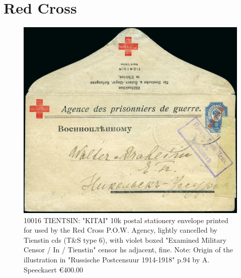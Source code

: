\section{Red Cross}

\begin{figure}[htbp]
\centering
\includegraphics[width=.95\textwidth]{../russian-post-offices-in-china/10016.jpg}
\caption{
10016	TIENTSIN: "KITAI" 10k postal stationery envelope printed for used by
the Red Cross P.O.W. Agency, lightly cancelled by Tienstin cds (T\&S type 6), 
with violet boxed "Examined Military Censor / In / Tienstin" censor hs adjacent, 
fine.
Note: Origin of the illustration in "Russische Postcensuur 1914-1918" p.94
by A. Speeckaert
\euro 400.00
}  
\end{figure}

